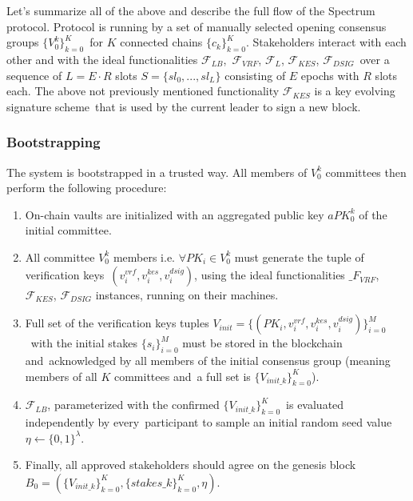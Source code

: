 Let's summarize all of the above and describe the full flow of the Spectrum protocol.
Protocol is running by a set of manually selected opening consensus groups $\{V^k_0\}_{k=0}^K$\
for $K$ connected chains $\{c_k\}_{k=0}^K$.
Stakeholders interact with each other and with the ideal functionalities ${\mathcal{F}}_{LB}$,\
${\mathcal{F}}_{VRF}$, ${\mathcal{F}}_{L}$, ${\mathcal{F}}_{KES}$, ${\mathcal{F}}_{DSIG}$\
over a sequence of $L = E \cdot R$ slots ${S=\{sl_0,...,sl_L\}}$ consisting of $E$ epochs with $R$ slots each.
The above not previously mentioned functionality ${\mathcal{F}}_{KES}$ is a key evolving signature scheme\
that is used by the current leader to sign a new block.

\subsubsection{Bootstrapping}\label{subsubsec:bootstrapping}

The system is bootstrapped in a trusted way.
All members of $V^k_0$ committees then perform the following procedure:
\begin{enumerate}
    \item On-chain vaults are initialized with an aggregated public key $aPK^k_0$ of the initial committee.

    \item All committee $V^k_0$ members i.e. $\forall PK_i \in V^k_0$ must generate the tuple of verification keys\
    ${(v_i^{vrf}, v_i^{kes}, v_i^{dsig})}$, using the ideal functionalities ${\mathcal_{F}}_{VRF}$,\
    ${\mathcal{F}}_{KES}$, ${\mathcal{F}}_{DSIG}$ instances, running on their machines.

    \item Full set of the verification keys tuples ${V_{init} = \{(PK_i, v_i^{vrf}, v_i^{kes}, v_i^{dsig})\}_{i=0}^M}$\
    with the initial stakes $\{s_i\}_{i=0}^M$ must be stored in the blockchain and\
    acknowledged by all members of the initial consensus group (meaning members of all $K$ committees and\
    a full set is $\{V_{init\_k}\}_{k=0}^{K}$).

    \item ${\mathcal{F}}_{LB}$, parameterized with the confirmed $\{V_{init\_k}\}_{k=0}^{K}$\
    is evaluated independently by every\
    participant to sample an initial random seed value $\eta \leftarrow \{0, 1\}^\lambda$.

    \item Finally, all approved stakeholders should agree on the genesis block\
    ${B_0=\left(\{V_{init\_k}\}_{k=0}^{K}, \{stakes\_k\}_{k=0}^{K}, \eta\right)}$.
\end{enumerate}

